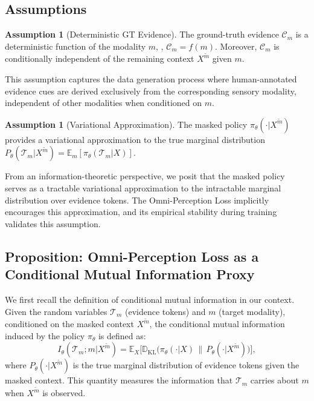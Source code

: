 \documentclass{article}
\theoremstyle{plain}
\theoremstyle{definition}
\newtheorem{assumption}[theorem]{Assumption}
\theoremstyle{remark}
\begin{document}
\subsection{Assumptions}

\begin{assumption}[Deterministic GT Evidence]
\label{assumption1}
The ground-truth evidence $\mathcal{C}_{m}$ is a deterministic function of the modality $m$, \ie, $\mathcal{C}_{m} = f(m)$. Moreover, $\mathcal{C}_{m}$ is conditionally independent of the remaining context $X^{\tilde{m}}$ given $m$.
\end{assumption}

This assumption captures the data generation process where human-annotated evidence cues are derived exclusively from the corresponding sensory modality, independent of other modalities when conditioned on $m$.

\begin{assumption}[Variational Approximation]
\label{assumption2}
The masked policy $\pi_\theta(\cdot | X^{\tilde{m}})$ provides a variational approximation to the true marginal distribution $P_\theta(\mathcal{T}_{m} | X^{\tilde{m}}) = \mathbb{E}_{m} [\pi_\theta(\mathcal{T}_{m} | X)]$.
\end{assumption}

From an information-theoretic perspective, we posit that the masked policy serves as a tractable variational approximation to the intractable marginal distribution over evidence tokens. The Omni-Perception Loss implicitly encourages this approximation, and its empirical stability during training validates this assumption.

\subsection{Proposition: Omni-Perception Loss as a Conditional Mutual Information Proxy}
\label{proposition1}
We first recall the definition of conditional mutual information in our context. Given the random variables $\mathcal{T}_{m}$ (evidence tokens) and $m$ (target modality), conditioned on the masked context $X^{\tilde{m}}$, the conditional mutual information induced by the policy $\pi_\theta$ is defined as:
\begin{equation}
I_\theta(\mathcal{T}_{m}; m | X^{\tilde{m}}) = \mathbb{E}_{X} \big[ \mathbb{D}_{\mathrm{KL}}\big( \pi_\theta(\cdot | X) \,\|\, P_\theta(\cdot | X^{\tilde{m}}) \big) \big],
\end{equation}
where $P_\theta(\cdot | X^{\tilde{m}})$ is the true marginal distribution of evidence tokens given the masked context. This quantity measures the information that $\mathcal{T}_{m}$ carries about $m$ when $X^{\tilde{m}}$ is observed.
\end{document}
